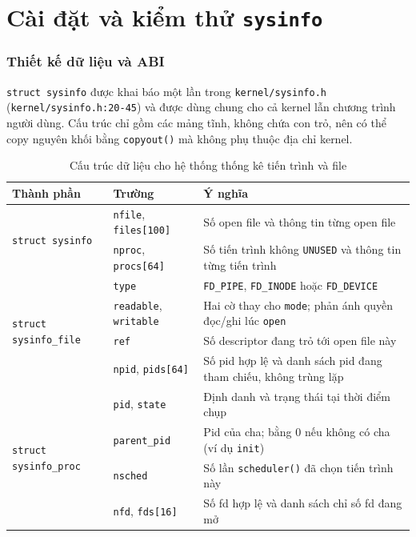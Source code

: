 \chapter{Cài đặt và kiểm thử \texttt{sysinfo}}

\newpage

\subsection{Thiết kế dữ liệu và ABI}

\texttt{struct sysinfo} được khai báo một lần trong \texttt{kernel/sysinfo.h} (\texttt{kernel/sysinfo.h:20-45}) và được dùng chung cho cả kernel lẫn chương trình người dùng. Cấu trúc chỉ gồm các mảng tĩnh, không chứa con trỏ, nên có thể copy nguyên khối bằng \texttt{copyout()} mà không phụ thuộc địa chỉ kernel.

\begin{table}[H]
    \centering
    \renewcommand{\arraystretch}{1.3}
    \setlength{\tabcolsep}{8pt}
    \begin{tabular}{|l|l|p{7cm}|}
        \hline
        \rowcolor[rgb]{0.8, 0.9, 1.0}
        \textbf{Thành phần} & \textbf{Trường} & \textbf{Ý nghĩa} \\ \hline
        \multirow{2}{*}{\texttt{struct sysinfo}} & \texttt{nfile}, \texttt{files[100]} & Số open file và thông tin từng open file \\ \cline{2-3}
        & \texttt{nproc}, \texttt{procs[64]} & Số tiến trình không \texttt{UNUSED} và thông tin từng tiến trình \\ \hline
        \multirow{4}{*}{\texttt{struct sysinfo\_file}} & \texttt{type} & \texttt{FD\_PIPE}, \texttt{FD\_INODE} hoặc \texttt{FD\_DEVICE} \\ \cline{2-3}
        & \texttt{readable}, \texttt{writable} & Hai cờ thay cho \texttt{mode}; phản ánh quyền đọc/ghi lúc \texttt{open} \\ \cline{2-3}
        & \texttt{ref} & Số descriptor đang trỏ tới open file này \\ \cline{2-3}
        & \texttt{npid}, \texttt{pids[64]} & Số pid hợp lệ và danh sách pid đang tham chiếu, không trùng lặp \\ \hline
        \multirow{4}{*}{\texttt{struct sysinfo\_proc}} & \texttt{pid}, \texttt{state} & Định danh và trạng thái tại thời điểm chụp \\ \cline{2-3}
        & \texttt{parent\_pid} & Pid của cha; bằng 0 nếu không có cha (ví dụ \texttt{init}) \\ \cline{2-3}
        & \texttt{nsched} & Số lần \texttt{scheduler()} đã chọn tiến trình này \\ \cline{2-3}
        & \texttt{nfd}, \texttt{fds[16]} & Số fd hợp lệ và danh sách chỉ số fd đang mở \\ \hline
    \end{tabular}
    \caption{Cấu trúc dữ liệu cho hệ thống thống kê tiến trình và file}
\end{table}

